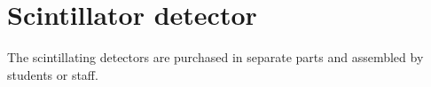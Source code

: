 \chapter{Scintillator detector}

The scintillating detectors are purchased in separate parts and assembled by
students or staff.







